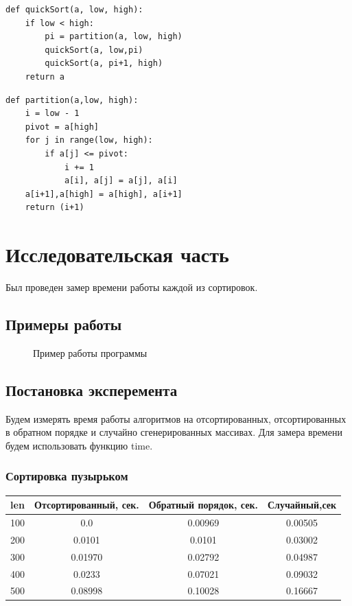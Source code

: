 \documentclass[12pt]{report}
\begin{document}
\begin{lstlisting}[label=some-code,caption=Быстрая сортировка]
def quickSort(a, low, high):
    if low < high:
        pi = partition(a, low, high)
        quickSort(a, low,pi)
        quickSort(a, pi+1, high)
    return a
\end{lstlisting}

\begin{lstlisting}[label=some-code,caption=Partition]
def partition(a,low, high):
    i = low - 1
    pivot = a[high]
    for j in range(low, high):
        if a[j] <= pivot:
            i += 1
            a[i], a[j] = a[j], a[i]
    a[i+1],a[high] = a[high], a[i+1]
    return (i+1)
\end{lstlisting}

\chapter{Исследовательская часть}

Был проведен замер времени работы каждой из сортировок.
\section{Примеры работы}
\begin{figure}[h]
\caption{Пример работы программы}
\label{ris:example}
\end{figure}
\section{Постановка эксперемента}
Будем измерять время работы алгоритмов на отсортированных, отсортированных в обратном порядке и случайно сгенерированных массивах. Для замера времени будем использовать функцию time.
\subsection{Сортировка пузырьком}
\begin{center}
	\begin{tabular}{|c c c c|} 
 	\hline
	len & Отсортированный, сек. & Обратный порядок, сек. & Случайный,сек \\ [0.5ex] 
 	\hline\hline
 	100 & 0.0 & 0.00969 & 0.00505 \\
 	\hline
 	200 & 0.0101 & 0.0101 & 0.03002\\
 	\hline
	300 & 0.01970 & 0.02792 & 0.04987 \\
	\hline
	400 & 0.0233 & 0.07021 & 0.09032 \\
	\hline
	500 & 0.08998 & 0.10028 & 0.16667\\
	\hline
	\end{tabular}
\end{center}
\end{document}
